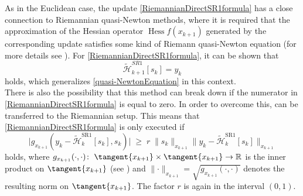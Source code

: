 As in the Euclidean case, the update \cref{RiemannianDirectSR1formula} has a close connection to Riemannian quasi-Newton methods, where it is required that the approximation of the Hessian operator $\operatorname{Hess} f(x_{k+1})$ generated by the corresponding update satisfies some kind of Riemann quasi-Newton equation (for more details see \cite[Chapter~2]{Huang:2013}). For \cref{RiemannianDirectSR1formula}, it can be shown that 
\begin{equation*}
    \widetilde{\mathcal{H}}^{SR1}_{k+1} [s_k] = y_k 
\end{equation*}
holds, which generalizes \cref{quasi-NewtonEquation} in this context. \\


There is also the possibility that this method can break down if the numerator in \cref{RiemannianDirectSR1formula} is equal to zero. In order to overcome this, can be transferred to the Riemannian setup. This means that \cref{RiemannianDirectSR1formula} is only executed if
\begin{equation}\label{RiemannianSafeguard}
    \lvert g_{x_{k+1}}(y_k - \widetilde{\mathcal{H}}^\mathrm{SR1}_k [s_k], s_k) \lvert \; \geq \; r \; \lVert s_k \rVert_{x_{k+1}} \lVert y_k - \widetilde{\mathcal{H}}^\mathrm{SR1}_k [s_k] \rVert_{x_{k+1}} 
\end{equation}
holds, where $g_{x_{k+1}}(\cdot, \cdot) \colon \; \tangent{x_{k+1}} \times \tangent{x_{k+1}} \to \mathbb{R}$ is the inner product on $\tangent{x_{k+1}}$ (see \cite[p.~6]{BergmannHerzogLouzeiroSilvaTenbrinckVidalNunez:2020:1}) and $ \lVert \cdot \rVert_{x_{k+1}} = \sqrt{g_{x_{k+1}}(\cdot, \cdot)}$ denotes the resulting norm on $\tangent{x_{k+1}}$. The factor $r$ is again in the interval $(0,1)$. \\















